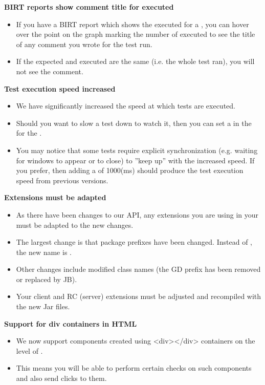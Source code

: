 \textbf{BIRT reports show comment title for executed \gdsteps{}}
\begin{itemize}
\item If you have a BIRT report which shows the executed \gdsteps{} for a \gdsuite{}, you can hover over the point on the graph marking the number of executed \gdsteps{} to see the title of any comment you wrote for the test run.
\item If the expected \gdsteps{} and executed \gdsteps{} are the same (i.e. the whole test ran), you will not see the comment.
\end{itemize}

\textbf{Test execution speed increased}
\begin{itemize}
\item We have significantly increased the speed at which tests are executed.
\item Should you want to slow a test down to watch it, then you can set a  in the \gdpropview{} for the \gdsuite{}.
\item You may notice that some tests require explicit synchronization (e.g. waiting for windows to appear or to close) to ''keep up'' with the increased speed. If you prefer, then adding a  of 1000(ms) should produce the test execution speed from previous versions. 
\end{itemize}

\textbf{Extensions must be adapted}
\begin{itemize}
\item As there have been changes to our API, any extensions you are using in your \gdprojects{} must be adapted to the new changes. 
\item The largest change is that package prefixes have been changed. Instead of , the new name is .
\item Other changes include modified class names (the GD prefix has been removed or replaced by JB). 
\item Your client and RC (server) extensions must be adjusted and recompiled with the new Jar files.
\end{itemize}

\textbf{Support for div containers in HTML}
\begin{itemize}
\item We now support components created using <div></div> containers on the level of .
\item This means you will be able to perform certain checks on such components and also send clicks to them.
\end{itemize}

